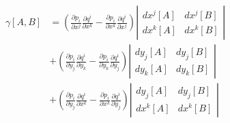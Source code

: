 \documentclass[a4paper,10pt]{article}
\numberwithin{equation}{section}
\begin{document}
\begin{align}
\begin{split}
 \gamma[A,B] &= \left(\frac{\partial p_i}{\partial x^j}\frac{\partial q^i}{\partial x^k} 
 - \frac{\partial p_i}{\partial x^k}\frac{\partial q^i}{\partial x^j}\right)\left|\begin{matrix}
                                                                             dx^j[A] & dx^j[B] \\
                                                                             dx^k[A] & dx^k[B]
                                                                            \end{matrix}\right| \\
 &+ \left(\frac{\partial p_i}{\partial y_j}\frac{\partial q^i}{\partial y_k} 
 - \frac{\partial p_i}{\partial y_k}\frac{\partial q^i}{\partial y_j}\right)\left|\begin{matrix}
                                                                             dy_j[A] & dy_j[B] \\
                                                                             dy_k[A] & dy_k[B]
                                                                            \end{matrix}\right| \\
 &+ \left(\frac{\partial p_i}{\partial y_j}\frac{\partial q^i}{\partial x^k} 
 - \frac{\partial p_i}{\partial x^k}\frac{\partial q^i}{\partial y_j}\right)\left|\begin{matrix}
                                                                             dy_j[A] & dy_j[B] \\
                                                                             dx^k[A] & dx^k[B]
                                                                            \end{matrix}\right|
\end{split}
\end{align}
\end{document}
